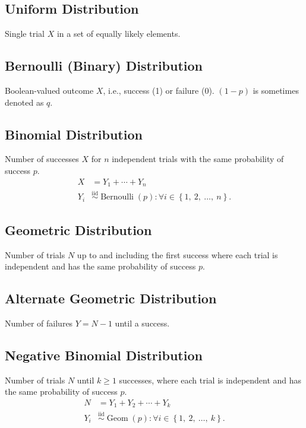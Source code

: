 \documentclass{article}
\begin{document}
\begin{minipage}{62.39259259mm}
    \subsection{Uniform Distribution}
    Single trial \(X\) in a set of equally likely elements.
    \subsection{Bernoulli (Binary) Distribution}
    Boolean-valued outcome \(X\), i.e., success (1) or failure (0).
    \(\left( 1 - p \right)\) is sometimes denoted as \(q\).
    \subsection{Binomial Distribution}
    Number of successes \(X\) for \(n\) independent trials with the same probability of success \(p\).
    \begin{align*}
        X   & = Y_1 + \cdots + Y_n                                                                                                           \\
        Y_i & \overset{\mathrm{iid}}{\sim} \operatorname{Bernoulli}{\left( p \right)} : \forall i \in \left\{ 1,\: 2,\: \dots,\: n \right\}.
    \end{align*}
    \subsection{Geometric Distribution}
    Number of trials \(N\) up to and including the first success where each trial is independent and has the same probability of success \(p\).
    \subsection{Alternate Geometric Distribution}
    Number of failures \(Y = N - 1\) until a success.
    \subsection{Negative Binomial Distribution}
    Number of trials \(N\) until \(k \geq 1\) successes, where each trial is independent and has the same probability of success \(p\).
    \begin{align*}
        N   & = Y_1 + Y_2 + \cdots + Y_k                                                                                                \\
        Y_i & \overset{\mathrm{iid}}{\sim} \operatorname{Geom}{\left( p \right)} : \forall i \in \left\{ 1,\: 2,\: \dots,\: k \right\}.
    \end{align*}

\end{minipage}
\end{document}

